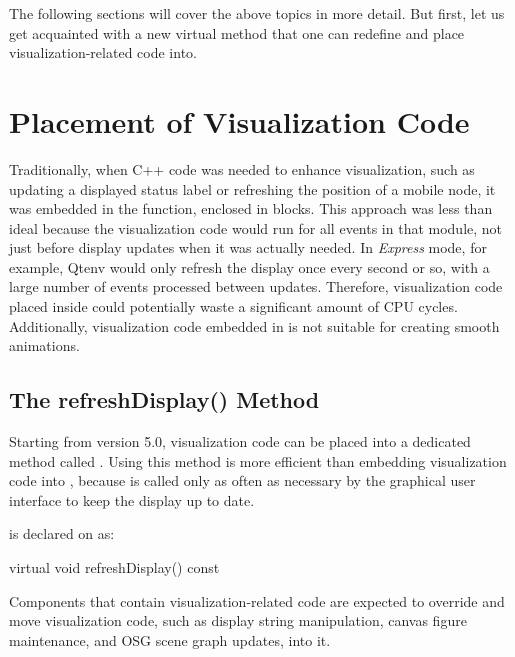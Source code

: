 The following sections will cover the above topics in more detail. But first,
let us get acquainted with a new  virtual method that one
can redefine and place visualization-related code into.


\section{Placement of Visualization Code}
\label{sec:graphics:refreshdisplay}

Traditionally, when C++ code was needed to enhance visualization, such as
updating a displayed status label or refreshing the position of a mobile node,
it was embedded in the  function, enclosed in  blocks. This approach was less than ideal because the
visualization code would run for all events in that module, not just before
display updates when it was actually needed. In \textit{Express} mode, for
example, Qtenv would only refresh the display once every second or so, with a
large number of events processed between updates. Therefore, visualization code
placed inside  could potentially waste a significant
amount of CPU cycles. Additionally, visualization code embedded in
 is not suitable for creating smooth animations.


\subsection{The refreshDisplay() Method}
\label{sec:graphics:refreshdisplay-usage-and-semantics}

Starting from {\opp} version 5.0, visualization code can be placed into a
dedicated method called . Using this method is more
efficient than embedding visualization code into ,
because  is called only as often as necessary
by the graphical user interface to keep the display up to date.

 is declared on  as:

\begin{cpp}
virtual void refreshDisplay() const {}
\end{cpp}

Components that contain visualization-related code are expected to override
 and move visualization code, such as display string
manipulation, canvas figure maintenance, and OSG scene graph updates, into it.


